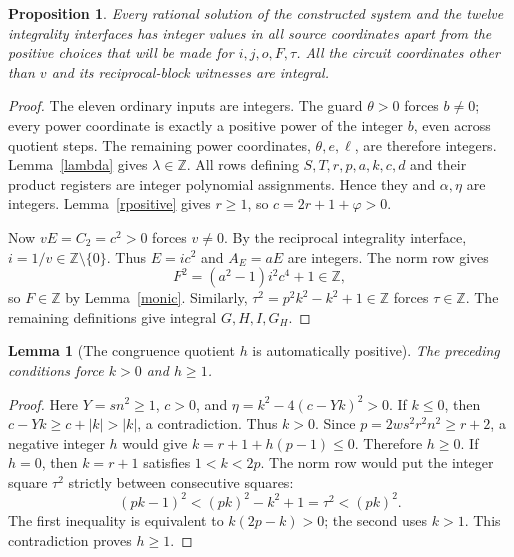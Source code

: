 \documentclass[11pt]{article}
\newtheorem{lemma}[theorem]{Lemma}
\newtheorem{proposition}[theorem]{Proposition}
\newcommand{\Z}{\mathbb Z}
\begin{document}
\begin{proposition}\label{integer-reconstruction}
Every rational solution of the constructed system and the twelve
integrality interfaces has integer values in all source coordinates
apart from the positive choices that will be made for \(i,j,o,F,\tau\).
All the circuit coordinates other than \(v\) and its reciprocal-block
witnesses are integral.
\end{proposition}
\begin{proof}
The eleven ordinary inputs are integers. The guard \(\theta>0\)
forces \(b\ne0\); every power coordinate is exactly a positive power
of the integer \(b\), even across quotient steps. The remaining power
coordinates, \(\theta,e,\ell\), are therefore integers.
Lemma~\ref{lambda} gives \(\lambda\in\Z\).
All rows defining \(S,T,r,p,a,k,c,d\) and their product registers are
integer polynomial assignments. Hence they and \(\alpha,\eta\) are
integers. Lemma~\ref{rpositive} gives \(r\ge1\), so
\(c=2r+1+\varphi>0\).

Now \(vE=C_2=c^2>0\) forces \(v\ne0\). By the reciprocal
integrality interface, \(i=1/v\in\Z\setminus\{0\}\). Thus
\(E=ic^2\) and \(A_E=aE\) are integers. The norm row gives
\[
 F^2=(a^2-1)i^2c^4+1\in\Z,
\]
so \(F\in\Z\) by Lemma~\ref{monic}. Similarly,
\(\tau^2=p^2k^2-k^2+1\in\Z\) forces \(\tau\in\Z\).
The remaining definitions give integral \(G,H,I,G_H\).
\end{proof}

\begin{lemma}[The congruence quotient \(h\) is automatically positive]
\label{hpositive}
The preceding conditions force \(k>0\) and \(h\ge1\).
\end{lemma}
\begin{proof}
Here \(Y=sn^2\ge1\), \(c>0\), and
\(\eta=k^2-4(c-Yk)^2>0\). If \(k\le0\), then
\(c-Yk\ge c+|k|>|k|\), a contradiction. Thus \(k>0\).
Since \(p=2ws^2r^2n^2\ge r+2\), a negative integer \(h\)
would give \(k=r+1+h(p-1)\le0\). Therefore \(h\ge0\).
If \(h=0\), then \(k=r+1\) satisfies \(1<k<2p\). The norm row
would put the integer square \(\tau^2\) strictly between consecutive
squares:
\[
 (pk-1)^2<(pk)^2-k^2+1=\tau^2<(pk)^2.
\]
The first inequality is equivalent to \(k(2p-k)>0\); the second uses
\(k>1\). This contradiction proves \(h\ge1\).
\end{proof}
\end{document}
